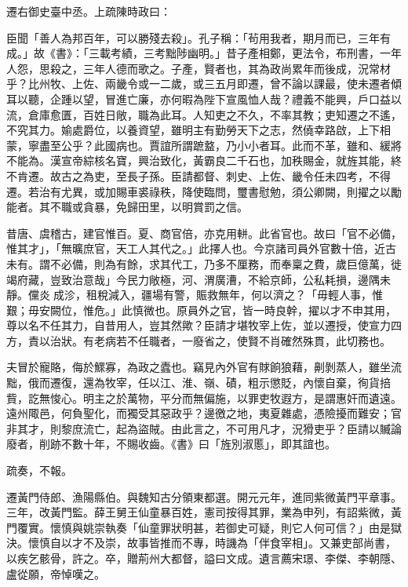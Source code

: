 \begin{pinyinscope}
 遷右御史臺中丞。上疏陳時政曰：



 臣聞「善人為邦百年，可以勝殘去殺」。孔子稱：「茍用我者，期月而已，三年有成。」故《書》：「三載考績，三考黜陟幽明。」昔子產相鄭，更法令，布刑書，一年人怨，思殺之，三年人德而歌之。子產，賢者也，其為政尚累年而後成，況常材乎？比州牧、上佐、兩畿令或一二歲，或三五月即遷，曾不論以課最，使未遷者傾耳以聽，企踵以望，冒進亡廉，亦何暇為陛下宣風恤人哉？禮義不能興，戶口益以流，倉庫愈匱，百姓日敞，職為此耳。人知吏之不久，不率其教；吏知遷之不遙，不究其力。媮處爵位，以養資望，雖明主有勤勞天下之志，然僥幸路啟，上下相蒙，寧盡至公乎？此國病也。賈誼所謂蹠盩，乃小小者耳。此而不革，雖和、緩將不能為。漢宣帝綜核名寶，興治致化，黃霸良二千石也，加秩賜金，就旌其能，終不肯遷。故古之為吏，至長子孫。臣請都督、刺史、上佐、畿令任未四考，不得遷。若治有尤異，或加賜車裘祿秩，降使臨問，璽書慰勉，須公卿闕，則擢之以勵能者。其不職或貪暴，免歸田里，以明賞罰之信。



 昔唐、虞稽古，建官惟百。夏、商官倍，亦克用軿。此省官也。故曰「官不必備，惟其才」，「無曠庶官，天工人其代之。」此擇人也。今京諸司員外官數十倍，近古未有。謂不必備，則為有餘，求其代工，乃多不厘務，而奉稟之費，歲巨億萬，徙竭府藏，豈致治意哉」今民力敞極，河、渭廣漕，不給京師，公私耗損，邊隅未靜。儻炎成沴，租稅減入，疆場有警，賑救無年，何以濟之？「毋輕人事，惟艱；毋安闕位，惟危。」此慎微也。原員外之官，皆一時良幹，擢以才不申其用，尊以名不任其力，自昔用人，豈其然歟？臣請才堪牧宰上佐，並以遷授，使宣力四方，責以治狀。有老病若不任職者，一廢省之，使賢不肖確然殊貫，此切務也。



 夫冒於寵賂，侮於鰥寡，為政之蠹也。竊見內外官有賕餉狼藉，劓剝蒸人，雖坐流黜，俄而遷復，還為牧宰，任以江、淮、嶺、磧，粗示懲貶，內懷自棄，徇貨掊貲，訖無悛心。明主之於萬物，平分而無偏施，以罪吏牧遐方，是謂惠奸而遺遠。遠州陬邑，何負聖化，而獨受其惡政乎？邊徼之地，夷夏雜處，憑險擾而難安；官非其才，則黎庶流亡，起為盜賊。由此言之，不可用凡才，況猾吏乎？臣請以贓論廢者，削跡不數十年，不賜收齒。《書》曰「旌別淑慝」，即其誼也。



 疏奏，不報。



 遷黃門侍郎、漁陽縣伯。與魏知古分領東都選。開元元年，進同紫微黃門平章事。三年，改黃門監。薛王舅王仙童暴百姓，憲司按得其罪，業為申列，有詔紫微，黃門覆實。懷慎與姚崇執奏「仙童罪狀明甚，若御史可疑，則它人何可信？」由是獄決。懷慎自以才不及崇，故事皆推而不專，時譏為「伴食宰相」。又兼吏部尚書，以疾乞骸骨，許之。卒，贈荊州大都督，謚曰文成。遺言薦宋璟、李傑、李朝隱、盧從願，帝悼嘆之。




\end{pinyinscope}
